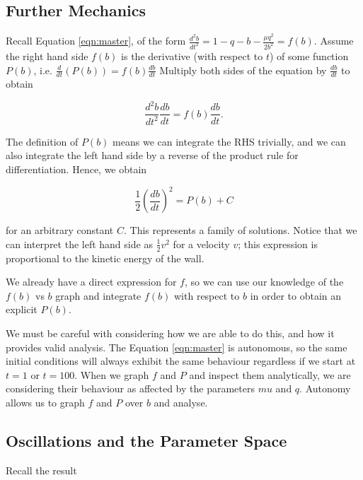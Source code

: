 \documentclass{article}
\begin{document}
\subsection{Further Mechanics}

Recall Equation \ref{eqn:master}, of the form $\frac{d^2b}{dt^2} = 1 - q - b - \frac{\mu q^2}{2 b^2} = f(b)$.
Assume the right hand side $f(b)$ is the derivative (with respect to $t$) of some function $P(b)$,
i.e. $\frac{d}{dt}\left(P(b)\right) = f(b)\frac{db}{dt} $ %
Multiply both sides of the equation by $\frac{db}{dt}$ to obtain

\begin{equation*}
    \frac{d^2b}{dt^2} \frac{db}{dt} = f(b) \frac{db}{dt}.
\end{equation*}

The definition of $P(b)$ means we can integrate the RHS trivially,
and we can also integrate the left hand side by a reverse of the product rule for differentiation.
Hence, we obtain

\begin{equation}
    \frac{1}{2}\left(\frac{db}{dt}\right)^2 = P(b) + C
\end{equation}

for an arbitrary constant $C$. This represents a family of solutions.
Notice that we can interpret the left hand side as $\frac{1}{2}v^2$ for a velocity $v$;
this expression is proportional to the kinetic energy of the wall.

We already have a direct expression for $f$,
so we can use our knowledge of the $f(b)$ vs $b$ graph and integrate $f(b)$ with respect to $b$
in order to obtain an explicit $P(b)$.

We must be careful with considering how we are able to do this, and how it provides valid analysis.
The Equation \ref{eqn:master} is autonomous,
so the same initial conditions will always exhibit the same behaviour regardless if we start at $t=1$ or $t=100$.
When we graph $f$ and $P$ and inspect them analytically, we are considering their behaviour as affected by the parameters $mu$ and $q$.
Autonomy allows us to graph $f$ and $P$ over $b$ and analyse.

\subsection{Oscillations and the Parameter Space}

Recall the result
\end{document}
